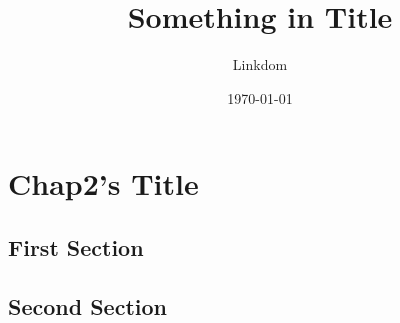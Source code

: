 \documentclass{article}
\title{Something in Title}
\author{Linkdom}
\date{\today}
\begin{document}
\maketitle
\else
\chapter{Chap2's Title}
\fi
\section{First Section}
\section{Second Section}
\ifx\allfiles\undefined
\end{document}
